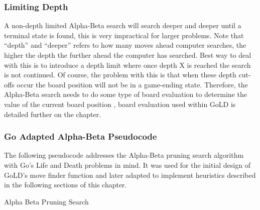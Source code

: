 \documentclass{l4proj}
\begin{document}
\subsubsection{Limiting Depth}
A non-depth limited Alpha-Beta search will search deeper and deeper until a terminal state is found, this is very impractical for larger problems. Note that “depth” and “deeper” refers to how many moves ahead computer searches, the higher the depth the further ahead the computer has searched. Best way to deal with this is to introduce a depth limit where once depth X is reached the search is not continued. Of course, the problem with this is that when these depth cut-offs occur the board position will not be in a game-ending state. Therefore, the Alpha-Beta search needs to do some type of board evaluation to determine the value of the current board position , board evaluation used within GoLD is detailed further on the chapter.

\subsubsection{Go Adapted Alpha-Beta Pseudocode}
The following pseudocode addresses the Alpha-Beta pruning search algorithm with Go's Life and Death problems in mind. It was used for the initial design of GoLD's move finder function and later adapted to implement heuristics described in the following sections of this chapter.

\begin{algorithm}[H]
\caption{Alpha Beta Pruning Search}\label{Alpha-Beta}
    \DontPrintSemicolon
\end{algorithm}
\end{document}
